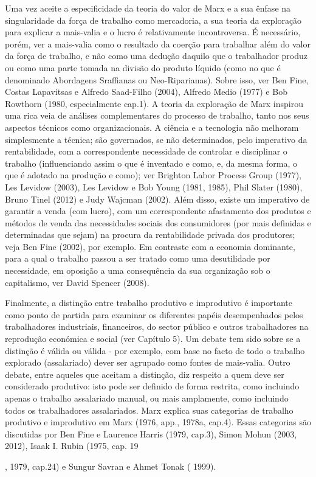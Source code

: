 Uma vez aceite a especificidade da teoria do valor de Marx e a sua ênfase na singularidade da força de trabalho como mercadoria, a sua teoria da exploração para explicar a mais-valia e o lucro é relativamente incontroversa. É necessário, porém, ver a mais-valia como o resultado da coerção para trabalhar além do valor da força de trabalho, e não como uma dedução daquilo que o trabalhador produz ou como uma parte tomada na divisão do produto líquido (como no que é denominado Abordagens Sraffianas ou Neo-Riparianas). Sobre isso, ver Ben Fine, Costas Lapavitsas e Alfredo Saad-Filho (2004), Alfredo Medio (1977) e Bob Rowthorn (1980, especialmente cap.{\color{blue}1}). A teoria da exploração de Marx inspirou uma rica veia de análises complementares do processo de trabalho, tanto nos seus aspectos técnicos como organizacionais. A ciência e a tecnologia não melhoram simplesmente a técnica; são governados, se não determinados, pelo imperativo da rentabilidade, com a correspondente necessidade de controlar e disciplinar o trabalho (influenciando assim o que é inventado e como, e, da mesma forma, o que é adotado na produção e como); ver Brighton Labor Process Group (1977), Les Levidow (2003), Les Levidow e Bob Young (1981, 1985), Phil Slater (1980), Bruno Tinel (2012) e Judy Wajcman (2002). Além disso, existe um imperativo de garantir a venda (com lucro), com um correspondente afastamento dos produtos e métodos de venda das necessidades sociais dos consumidores (por mais definidas e determinadas que sejam) na procura da rentabilidade privada dos produtores; veja Ben Fine (2002), por exemplo. Em contraste com a economia dominante, para a qual o trabalho passou a ser tratado como uma desutilidade por necessidade, em oposição a uma consequência da sua organização sob o capitalismo, ver David Spencer (2008).
 \par 
Finalmente, a distinção entre trabalho produtivo e improdutivo é importante como ponto de partida para examinar os diferentes papéis desempenhados pelos trabalhadores industriais, financeiros, do sector público e outros trabalhadores na reprodução económica e social (ver Capítulo {\color{blue}5}). Um debate tem sido sobre se a distinção é válida ou válida - por exemplo, com base no facto de todo o trabalho explorado (assalariado) dever ser agrupado como fontes de mais-valia. Outro debate, entre aqueles que aceitam a distinção, diz respeito a quem deve ser considerado produtivo: isto pode ser definido de forma restrita, como incluindo apenas o trabalho assalariado manual, ou mais amplamente, como incluindo todos os trabalhadores assalariados. Marx explica suas categorias de trabalho produtivo e improdutivo em Marx (1976, app., 1978a, cap.{\color{blue}4}). Essas categorias são discutidas por Ben Fine e Laurence Harris (1979, cap.{\color{blue}3}), Simon Mohun (2003, 2012), Isaak I. Rubin (1975, cap. {\color{blue} 19 } {\par} , 1979, cap.{\color{blue}24}) e Sungur Savran e Ahmet Tonak ( 1999).